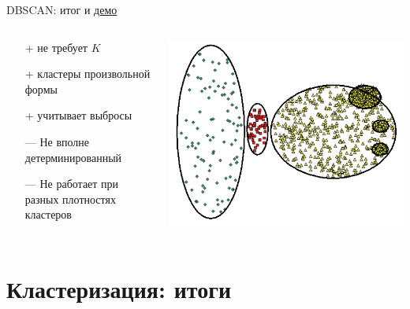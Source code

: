 \documentclass[10pt]{beamer}
\begin{document}
\begin{frame}{DBSCAN: итог и \href{http://www.naftaliharris.com/blog/visualizing-dbscan-clustering/}{демо}}

\begin{columns}[C]
    \begin{column}{.6\textwidth} 
    \begin{itemize}
	\item[+] не требует $K$
	\item[+] кластеры произвольной формы
	\item[+] учитывает выбросы
	\item[---] Не вполне детерминированный
	\item[---] Не работает при разных плотностях кластеров
	\end{itemize}		    
    \end{column}
    \begin{column}{.4\textwidth}
    \vspace{1em}
    \includegraphics[scale=0.25]{images/dbprob.png}    
    \end{column}
\end{columns}

\end{frame}


\section{Кластеризация: итоги}
\end{document}
